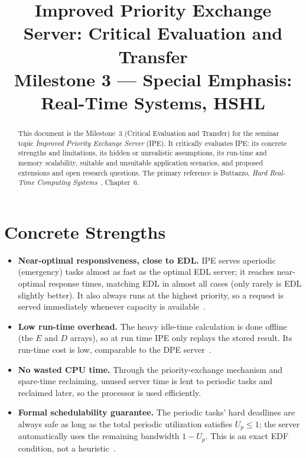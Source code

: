 \documentclass[conference]{IEEEtran}
\begin{document}
\title{Improved Priority Exchange Server: Critical Evaluation and Transfer\\
{\footnotesize Milestone 3 --- Special Emphasis: Real-Time Systems, HSHL}}

\author{
}

\maketitle

\begin{abstract}
This document is the Milestone~3 (Critical Evaluation and Transfer) for the
seminar topic \emph{Improved Priority Exchange Server} (IPE). It critically
evaluates IPE: its concrete strengths and limitations, its hidden or
unrealistic assumptions, its run-time and memory scalability, suitable and
unsuitable application scenarios, and proposed extensions and open research
questions. The primary reference is Buttazzo, \textit{Hard Real-Time Computing
Systems}~\cite{buttazzo}, Chapter~6.
\end{abstract}

\section{Concrete Strengths}

\begin{itemize}
  \item \textbf{Near-optimal responsiveness, close to EDL.} IPE serves
        aperiodic (emergency) tasks almost as fast as the optimal EDL server;
        it reaches near-optimal response times, matching EDL in almost all
        cases (only rarely is EDL slightly better). It also always runs at the
        highest priority, so a request is served immediately whenever capacity
        is available~\cite{buttazzo}.
  \item \textbf{Low run-time overhead.} The heavy idle-time calculation is done
        offline (the $E$ and $D$ arrays), so at run time IPE only replays the
        stored result. Its run-time cost is low, comparable to the DPE
        server~\cite{buttazzo}.
  \item \textbf{No wasted CPU time.} Through the priority-exchange mechanism and
        spare-time reclaiming, unused server time is lent to periodic tasks and
        reclaimed later, so the processor is used efficiently.
  \item \textbf{Formal schedulability guarantee.} The periodic tasks' hard
        deadlines are always safe as long as the total periodic utilization
        satisfies $U_p \leq 1$; the server automatically uses the remaining
        bandwidth $1 - U_p$. This is an exact EDF condition, not a
        heuristic~\cite{spuri1996}.
\end{itemize}
\end{document}
